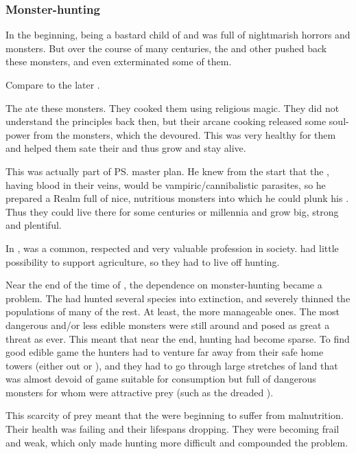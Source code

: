 \subsubsection{Monster-hunting}
In the beginning, \Nyx{}\dash being a bastard child of \Erebos{} and \Miith\dash was full of nightmarish horrors and monsters. 
But over the course of many centuries, the \Merkyrans{} and other \resphain{} pushed back these monsters, and even exterminated some of them. 

Compare to the later \human{} . 

The \resphain{} ate these monsters.
They cooked them using religious magic. 
They did not understand the principles back then, but their arcane cooking released some soul-power from the monsters, which the \resphain{} devoured. 
This was very healthy for them and helped them sate their  and thus grow and stay alive. 

This was actually part of \ps{\Daggerrain} master plan. 
He knew from the start that the \resphain, having \bane{} blood in their veins, would be vampiric/cannibalistic parasites, so he prepared a Realm full of nice, nutritious monsters into which he could plunk his \resphain. 
Thus they could live there for some centuries or millennia and grow big, strong and plentiful. 

In \Merkyrah,  was a common, respected and very valuable profession in society. 
\Nyx{} had little possibility to support agriculture, so they had to live off hunting. 

Near the end of the time of \Merkyrah, the dependence on monster-hunting became a problem.
The \resphain{} had hunted several species into extinction, and severely thinned the populations of many of the rest.
At least, the more manageable ones. 
The most dangerous and/or less edible monsters were still around and posed as great a threat as ever. 
This meant that near the end, hunting had become sparse. 
To find good edible game the \resphan{} hunters had to venture far away from their safe home towers (either out or \emph{}), and they had to go through large stretches of land that was almost devoid of game suitable for \resphan{} consumption but full of dangerous monsters for whom \emph{\resphain{}} were attractive prey (such as the dreaded ). 

This scarcity of prey meant that the \resphain{} were beginning to suffer from malnutrition. 
Their health was failing and their lifespans dropping. 
They were becoming frail and weak, which only made hunting more difficult and compounded the problem. 

